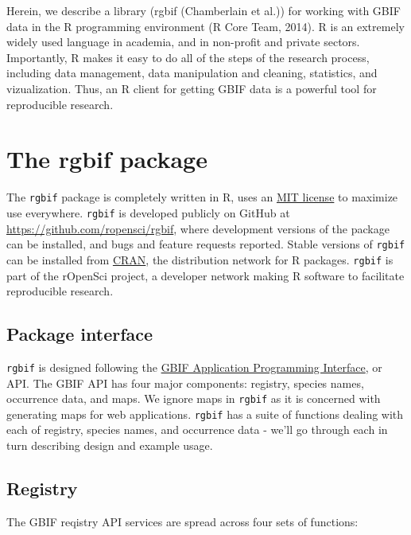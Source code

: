 \documentclass[author-year, review, 11pt]{components/elsarticle} %
\begin{document}
Herein, we describe a library (rgbif (Chamberlain et al.)) for working
with GBIF data in the R programming environment (R Core Team, 2014). R
is an extremely widely used language in academia, and in non-profit and
private sectors. Importantly, R makes it easy to do all of the steps of
the research process, including data management, data manipulation and
cleaning, statistics, and vizualization. Thus, an R client for getting
GBIF data is a powerful tool for reproducible research.

\section{The rgbif package}\label{the-rgbif-package}

The \texttt{rgbif} package is completely written in R, uses an
\href{http://choosealicense.com/licenses/mit/}{MIT license} to maximize
use everywhere. \texttt{rgbif} is developed publicly on GitHub at
\href{https://github.com/ropensci/rgbif}{\url{https://github.com/ropensci/rgbif}},
where development versions of the package can be installed, and bugs and
feature requests reported. Stable versions of \texttt{rgbif} can be
installed from
\href{https://cran.rstudio.com/web/packages/rgbif/}{CRAN}, the
distribution network for R packages. \texttt{rgbif} is part of the
rOpenSci project, a developer network making R software to facilitate
reproducible research.

\subsection{Package interface}\label{package-interface}

\texttt{rgbif} is designed following the
\href{http://www.gbif.org/developer/summary}{GBIF Application
Programming Interface}, or API. The GBIF API has four major components:
registry, species names, occurrence data, and maps. We ignore maps in
\texttt{rgbif} as it is concerned with generating maps for web
applications. \texttt{rgbif} has a suite of functions dealing with each
of registry, species names, and occurrence data - we'll go through each
in turn describing design and example usage.

\subsection{Registry}\label{registry}

The GBIF reqistry API services are spread across four sets of functions:
\end{document}
